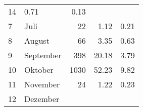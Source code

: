 \begin{longtable}{lXrrr}
       \num{14} &
       \num[round-mode=places,round-precision=2]{0,71} &
         \num[round-mode=places,round-precision=2]{0,13} \\

     7 &
     \multicolumn{1}{X}{ Juli   } &


       \num{22} &
       \num[round-mode=places,round-precision=2]{1,12} &
         \num[round-mode=places,round-precision=2]{0,21} \\

     8 &
     \multicolumn{1}{X}{ August   } &


       \num{66} &
       \num[round-mode=places,round-precision=2]{3,35} &
         \num[round-mode=places,round-precision=2]{0,63} \\

     9 &
     \multicolumn{1}{X}{ September   } &


       \num{398} &
       \num[round-mode=places,round-precision=2]{20,18} &
         \num[round-mode=places,round-precision=2]{3,79} \\

     10 &
     \multicolumn{1}{X}{ Oktober   } &


       \num{1030} &
       \num[round-mode=places,round-precision=2]{52,23} &
         \num[round-mode=places,round-precision=2]{9,82} \\

     11 &
     \multicolumn{1}{X}{ November   } &


       \num{24} &
       \num[round-mode=places,round-precision=2]{1,22} &
         \num[round-mode=places,round-precision=2]{0,23} \\

     12 &
     \multicolumn{1}{X}{ Dezember   } &



\end{longtable}
